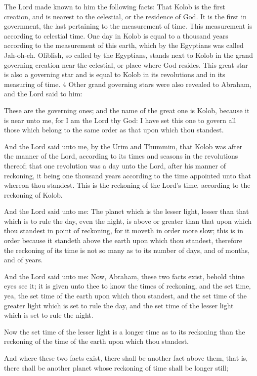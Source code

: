 The Lord made known to him the following facts: That Kolob is the first creation, and is
nearest to the celestial, or the residence of God. It is the first in government, the last
pertaining to the measurement of time. This measurement is according to celestial time. One
day in Kolob is equal to a thousand years according to the measurement of this earth, which
by the Egyptians was called Jah-oh-eh. Oliblish, so called by the Egyptians, stands next to
Kolob in the grand governing creation near the celestial, or place where God resides. This
great star is also a governing star and is equal to Kolob in its revolutions and in its measuring
of time. 4 Other grand governing stars were also revealed to Abraham, and the Lord said to
him:

These are the governing ones; and the name of the great one is Kolob, because it is near unto
me, for I am the Lord thy God: I have set this one to govern all those which belong to the
same order as that upon which thou standest.

And the Lord said unto me, by the Urim and Thummim, that Kolob was after the manner of
the Lord, according to its times and seasons in the revolutions thereof; that one revolution
was a day unto the Lord, after his manner of reckoning, it being one thousand years
according to the time appointed unto that whereon thou standest. This is the reckoning of the
Lord's time, according to the reckoning of Kolob.

And the Lord said unto me: The planet which is the lesser light, lesser than that which is to
rule the day, even the night, is above or greater than that upon which thou standest in point of
reckoning, for it moveth in order more slow; this is in order because it standeth above the
earth upon which thou standest, therefore the reckoning of its time is not so many as to its
number of days, and of months, and of years.

And the Lord said unto me: Now, Abraham, these two facts exist, behold thine eyes see it; it
is given unto thee to know the times of reckoning, and the set time, yea, the set time of the
earth upon which thou standest, and the set time of the greater light which is set to rule the
day, and the set time of the lesser light which is set to rule the night.

Now the set time of the lesser light is a longer time as to its reckoning than the reckoning of
the time of the earth upon which thou standest.

And where these two facts exist, there shall be another fact above them, that is, there shall be
another planet whose reckoning of time shall be longer still;

